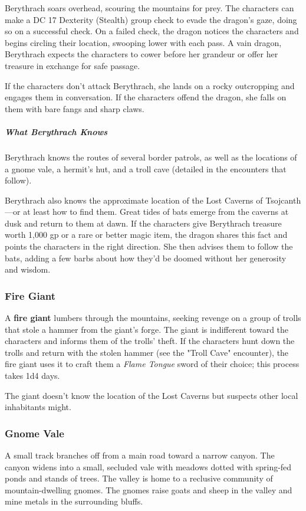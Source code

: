 \documentclass[10pt,a4paper,twoside,bg=print,twocolumn,openany,nodeprecatedcode]{dndbook}
\begin{document}
Berythrach soars overhead, scouring the mountains for prey. The characters can make a DC 17 Dexterity (Stealth) group check to evade the dragon's gaze, doing so on a successful check. On a failed check, the dragon notices the characters and begins circling their location, swooping lower with each pass. A vain dragon, Berythrach expects the characters to cower before her grandeur or offer her treasure in exchange for safe passage.

If the characters don't attack Berythrach, she lands on a rocky outcropping and engages them in conversation. If the characters offend the dragon, she falls on them with bare fangs and sharp claws.

\subparagraph{What Berythrach Knows}
Berythrach knows the routes of several border patrols, as well as the locations of a gnome vale, a hermit's hut, and a troll cave (detailed in the encounters that follow).

Berythrach also knows the approximate location of the Lost Caverns of Tsojcanth—or at least how to find them. Great tides of bats emerge from the caverns at dusk and return to them at dawn. If the characters give Berythrach treasure worth 1,000 gp or a rare or better magic item, the dragon shares this fact and points the characters in the right direction. She then advises them to follow the bats, adding a few barbs about how they'd be doomed without her generosity and wisdom.

\subsubsection{Fire Giant}
A \textbf{fire giant} lumbers through the mountains, seeking revenge on a group of trolls that stole a hammer from the giant's forge. The giant is indifferent toward the characters and informs them of the trolls' theft. If the characters hunt down the trolls and return with the stolen hammer (see the "Troll Cave" encounter), the fire giant uses it to craft them a \textit{Flame Tongue} sword of their choice; this process takes 1d4 days.

The giant doesn't know the location of the Lost Caverns but suspects other local inhabitants might.

\subsubsection{Gnome Vale}
A small track branches off from a main road toward a narrow canyon. The canyon widens into a small, secluded vale with meadows dotted with spring-fed ponds and stands of trees. The valley is home to a reclusive community of mountain-dwelling gnomes. The gnomes raise goats and sheep in the valley and mine metals in the surrounding bluffs.
\end{document}
